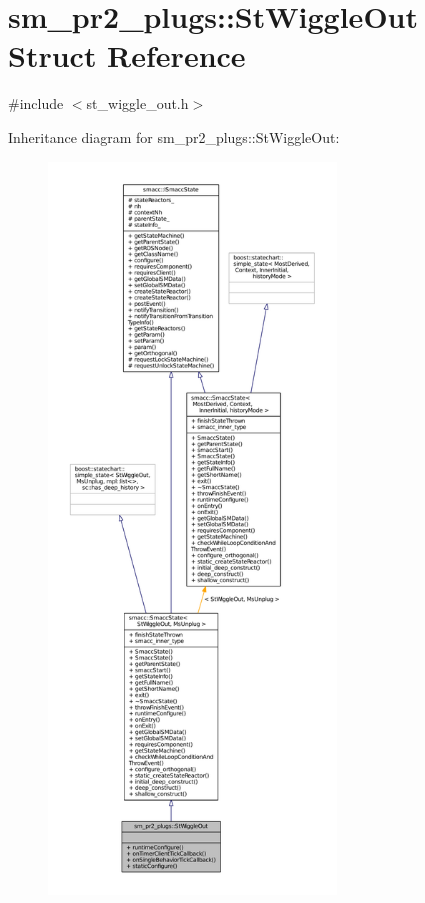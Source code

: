 \hypertarget{structsm__pr2__plugs_1_1StWiggleOut}{}\section{sm\+\_\+pr2\+\_\+plugs\+:\+:St\+Wiggle\+Out Struct Reference}
\label{structsm__pr2__plugs_1_1StWiggleOut}


{\ttfamily \#include $<$st\+\_\+wiggle\+\_\+out.\+h$>$}



Inheritance diagram for sm\+\_\+pr2\+\_\+plugs\+:\+:St\+Wiggle\+Out\+:
\nopagebreak
\begin{figure}[H]
\begin{center}
\leavevmode
\includegraphics[height=550pt]{structsm__pr2__plugs_1_1StWiggleOut__inherit__graph}
\end{center}
\end{figure}


